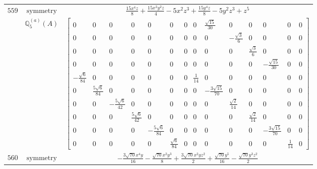 \documentclass[fleqn,8pt,landscape]{jsarticle}
\begin{document}
\begin{longtable}{ccc}
$ 559 $ & $ \text{symmetry} $ & $ \frac{15 x^{4} z}{8} + \frac{15 x^{2} y^{2} z}{4} - 5 x^{2} z^{3} + \frac{15 y^{4} z}{8} - 5 y^{2} z^{3} + z^{5} $ \\
$  $ & $ \mathbb{Q}_{5}^{(a)}(A) $ & $ \begin{bmatrix} 0 & 0 & 0 & 0 & 0 & 0 & 0 & 0 & \frac{\sqrt{15}}{30} & 0 & 0 & 0 & 0 & 0 \\ 0 & 0 & 0 & 0 & 0 & 0 & 0 & 0 & 0 & - \frac{\sqrt{3}}{6} & 0 & 0 & 0 & 0 \\ 0 & 0 & 0 & 0 & 0 & 0 & 0 & 0 & 0 & 0 & \frac{\sqrt{3}}{6} & 0 & 0 & 0 \\ 0 & 0 & 0 & 0 & 0 & 0 & 0 & 0 & 0 & 0 & 0 & - \frac{\sqrt{15}}{30} & 0 & 0 \\ - \frac{\sqrt{6}}{84} & 0 & 0 & 0 & 0 & 0 & 0 & \frac{1}{14} & 0 & 0 & 0 & 0 & 0 & 0 \\ 0 & \frac{5 \sqrt{6}}{84} & 0 & 0 & 0 & 0 & 0 & 0 & - \frac{3 \sqrt{15}}{70} & 0 & 0 & 0 & 0 & 0 \\ 0 & 0 & - \frac{5 \sqrt{6}}{42} & 0 & 0 & 0 & 0 & 0 & 0 & \frac{\sqrt{2}}{14} & 0 & 0 & 0 & 0 \\ 0 & 0 & 0 & \frac{5 \sqrt{6}}{42} & 0 & 0 & 0 & 0 & 0 & 0 & \frac{\sqrt{2}}{14} & 0 & 0 & 0 \\ 0 & 0 & 0 & 0 & - \frac{5 \sqrt{6}}{84} & 0 & 0 & 0 & 0 & 0 & 0 & - \frac{3 \sqrt{15}}{70} & 0 & 0 \\ 0 & 0 & 0 & 0 & 0 & \frac{\sqrt{6}}{84} & 0 & 0 & 0 & 0 & 0 & 0 & \frac{1}{14} & 0 \end{bmatrix} $ \\ \hline
$ 560 $ & $ \text{symmetry} $ & $ - \frac{3 \sqrt{70} x^{4} y}{16} - \frac{\sqrt{70} x^{2} y^{3}}{8} + \frac{3 \sqrt{70} x^{2} y z^{2}}{2} + \frac{\sqrt{70} y^{5}}{16} - \frac{\sqrt{70} y^{3} z^{2}}{2} $ \\

\end{longtable}
\end{document}
